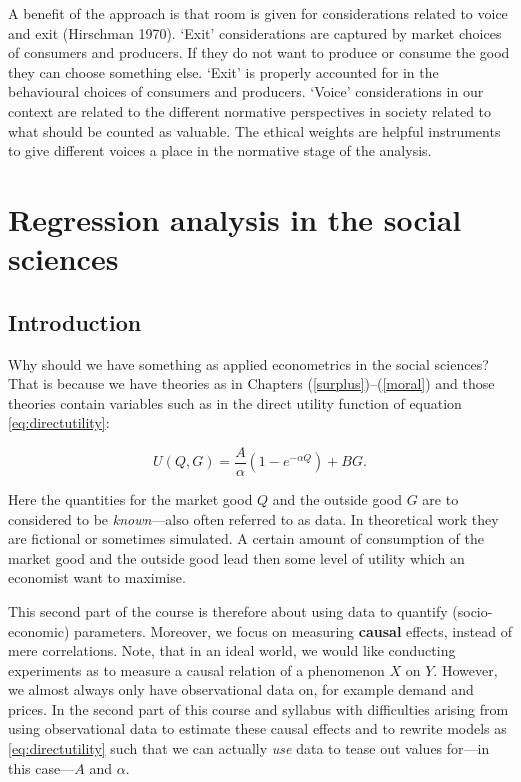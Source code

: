 \documentclass[
]{book}
\begin{document}
A benefit of the approach is that room is given for considerations related to voice and exit (Hirschman 1970). `Exit' considerations are captured by market choices of consumers and producers. If they do not want to produce or consume the good they can choose something else. `Exit' is properly accounted for in the behavioural choices of consumers and producers. `Voice' considerations in our context are related to the different normative perspectives in society related to what should be counted as valuable. The ethical weights are helpful instruments to give different voices a place in the normative stage of the analysis.

\hypertarget{regression-analysis-in-the-social-sciences}{%
\chapter{Regression analysis in the social sciences}\label{regression-analysis-in-the-social-sciences}}

\hypertarget{introduction-12}{%
\section{Introduction}\label{introduction-12}}

Why should we have something as applied econometrics in the social sciences? That is because we have theories as in Chapters (\ref{surplus})--(\ref{moral}) and those theories contain variables such as in the direct utility function of equation \eqref{eq:directutility}:

\begin{equation}
U(Q,G) = \frac{A}{\alpha}\left( 1- e^{-\alpha Q} \right ) + BG.
\end{equation}

Here the quantities for the market good \(Q\) and the outside good \(G\) are to considered to be \emph{known}---also often referred to as data. In theoretical work they are fictional or sometimes simulated. A certain amount of consumption of the market good and the outside good lead then some level of utility which an economist want to maximise.

This second part of the course is therefore about using data to quantify (socio-economic) parameters. Moreover, we focus on measuring \textbf{causal} effects, instead of mere correlations. Note, that in an ideal world, we would like conducting experiments as to measure a causal relation of a phenomenon \(X\) on \(Y\). However, we almost always only have observational data on, for example demand and prices. In the second part of this course and syllabus with difficulties arising from using observational data to estimate these causal effects and to rewrite models as \eqref{eq:directutility} such that we can actually \emph{use} data to tease out values for---in this case---\(A\) and \(\alpha\).
\end{document}
